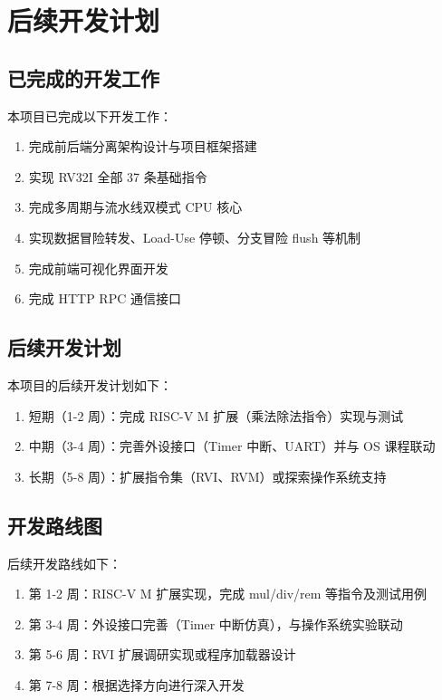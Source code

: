 \documentclass[12pt, a4paper]{article}
\begin{document}
\section{后续开发计划}\label{sec:future}

\subsection{已完成的开发工作}

本项目已完成以下开发工作：

\begin{enumerate}
\item 完成前后端分离架构设计与项目框架搭建
\item 实现 RV32I 全部 37 条基础指令
\item 完成多周期与流水线双模式 CPU 核心
\item 实现数据冒险转发、Load-Use 停顿、分支冒险 flush 等机制
\item 完成前端可视化界面开发
\item 完成 HTTP RPC 通信接口
\end{enumerate}

\subsection{后续开发计划}

本项目的后续开发计划如下：

\begin{enumerate}
\item 短期（1-2 周）：完成 RISC-V M 扩展（乘法除法指令）实现与测试
\item 中期（3-4 周）：完善外设接口（Timer 中断、UART）并与 OS 课程联动
\item 长期（5-8 周）：扩展指令集（RVI、RVM）或探索操作系统支持
\end{enumerate}

\subsection{开发路线图}

后续开发路线如下：

\begin{enumerate}
\item 第 1-2 周：RISC-V M 扩展实现，完成 mul/div/rem 等指令及测试用例
\item 第 3-4 周：外设接口完善（Timer 中断仿真），与操作系统实验联动
\item 第 5-6 周：RVI 扩展调研实现或程序加载器设计
\item 第 7-8 周：根据选择方向进行深入开发
\end{enumerate}
\end{document}
